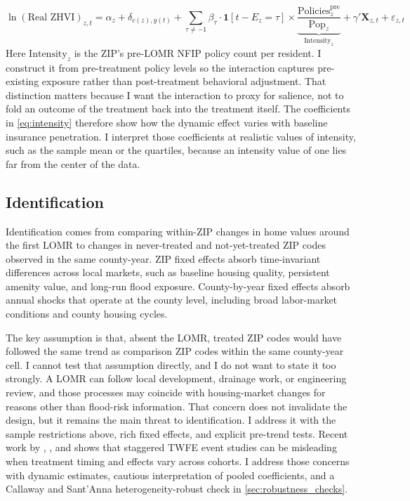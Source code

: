 \documentclass[12pt]{article}
\begin{document}
\begin{equation}\label{eq:intensity}
    \ln(\text{Real ZHVI})_{z,t} = \alpha_z + \delta_{c(z),y(t)} + \sum_{\tau \neq -1} \beta_\tau \cdot \mathbf{1}[t - E_z = \tau] \times \underbrace{\frac{\text{Policies}_z^{\text{pre}}}{\text{Pop}_z}}_{\text{Intensity}_z} + \gamma' \mathbf{X}_{z,t} + \varepsilon_{z,t}
\end{equation}
%
\noindent Here $\text{Intensity}_z$ is the ZIP's pre-LOMR NFIP policy count per resident. I construct it from pre-treatment policy levels so the interaction captures pre-existing exposure rather than post-treatment behavioral adjustment. That distinction matters because I want the interaction to proxy for salience, not to fold an outcome of the treatment back into the treatment itself. The coefficients in \autoref{eq:intensity} therefore show how the dynamic effect varies with baseline insurance penetration. I interpret those coefficients at realistic values of intensity, such as the sample mean or the quartiles, because an intensity value of one lies far from the center of the data.

\subsection{Identification}\label{sec:strategy_identification}

Identification comes from comparing within-ZIP changes in home values around the first LOMR to changes in never-treated and not-yet-treated ZIP codes observed in the same county-year. ZIP fixed effects absorb time-invariant differences across local markets, such as baseline housing quality, persistent amenity value, and long-run flood exposure. County-by-year fixed effects absorb annual shocks that operate at the county level, including broad labor-market conditions and county housing cycles.

The key assumption is that, absent the LOMR, treated ZIP codes would have followed the same trend as comparison ZIP codes within the same county-year cell. I cannot test that assumption directly, and I do not want to state it too strongly. A LOMR can follow local development, drainage work, or engineering review, and those processes may coincide with housing-market changes for reasons other than flood-risk information. That concern does not invalidate the design, but it remains the main threat to identification. I address it with the sample restrictions above, rich fixed effects, and explicit pre-trend tests. Recent work by \citet{GoodmanBacon2021}, \citet{SunAbraham2021}, and \citet{CallawaySantAnna2021} shows that staggered TWFE event studies can be misleading when treatment timing and effects vary across cohorts. I address those concerns with dynamic estimates, cautious interpretation of pooled coefficients, and a Callaway and Sant'Anna heterogeneity-robust check in \autoref{sec:robustness_checks}.
\end{document}
